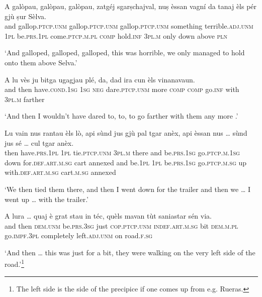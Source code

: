\begin{linenumbers}
\gll  A galòpau, galòpau, galòpau, zatgéj sgarṣchajval, nuṣ èssan vagní da tanaj èls pér gjù ṣur Sèlva\footnotemark.  \\ 
and gallop.\textsc{ptcp.unm} gallop.\textsc{ptcp.unm} gallop.\textsc{ptcp.unm} something terrible.\textsc{adj.unm} \textsc{1pl} be.\textsc{prs.1pl} come.\textsc{ptcp.m.pl}   \textsc{comp} hold.\textsc{inf} \textsc{3pl.m} only down above \textsc{pln}  \\
\end{linenumbers}
\medskip
\glt `And galloped, galloped, galloped, this was horrible, we only managed to hold onto them above Selva.'
\medskip

\begin{linenumbers}
\gll  A lu vès ju bitga ugagjau plé, da, dad ira cun èls vinanavaun.\\
and then have.\textsc{cond.1sg} \textsc{1sg} \textsc{neg} dare.\textsc{ptcp.unm} more \textsc{comp} \textsc{comp} go.\textsc{inf} with \textsc{3pl.m} farther\\
\end{linenumbers}
\medskip
\glt `And then I wouldn’t have dared to, to, to go farther with them any more .'
\medskip

\begin{linenumbers}
\gll Lu vain nus rantau èls lò, api sùnd jus gjù pal tgar anèx, api èssan nus … sùnd jus sé … cul tgar anèx.\\
then have.\textsc{prs.1pl} \textsc{1pl} tie.\textsc{ptcp.unm} \textsc{3pl.m} there and be.\textsc{prs.1sg} go.\textsc{ptcp.m.1sg} down for.\textsc{def.art.m.sg} cart annexed and be.\textsc{1pl} \textsc{1pl} {} be.\textsc{prs.1sg} go.\textsc{ptcp.m.sg} up {} with.\textsc{def.art.m.sg} cart.\textsc{m.sg} annexed \\
\end{linenumbers}
\medskip
\glt `We then tied them there, and then I went down for the trailer and then we … I went up … with the trailer.'
\medskip

\begin{linenumbers}
\gll A lura … quaj è grat stau in téc, quèls mavan tùt saniastar sén via.   \\
and then {} \textsc{dem.unm} be.\textsc{prs.3sg} just \textsc{cop.ptcp.unm} \textsc{indef.art.m.sg} bit \textsc{dem.m.pl} go.\textsc{impf.3pl} completely left.\textsc{adj.unm} on road.\textsc{f.sg}  \\
\end{linenumbers}
\medskip
\glt `And then … this was just for a bit, they were walking on the very left side of the road.'\footnote{The left side is the side of the precipice if one comes up from e.g. Rueras.}
\medskip

